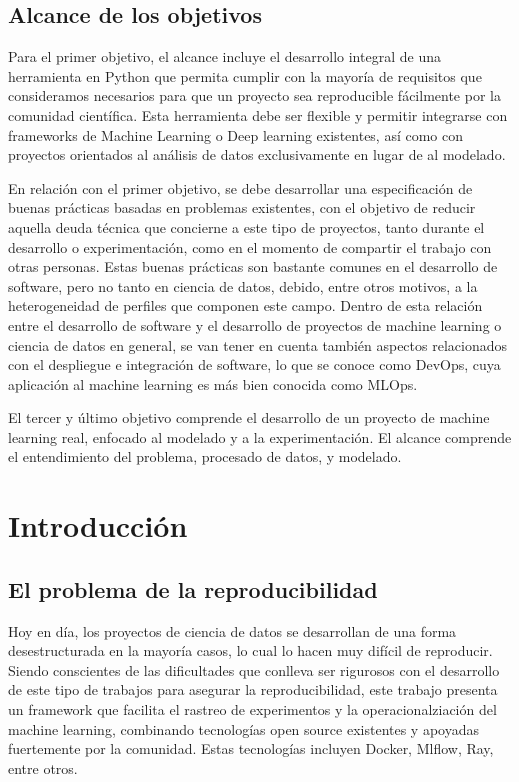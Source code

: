 \documentclass[
  12pt,
  a4paperpaper,
]{report}
\begin{document}
\hypertarget{alcance-de-los-objetivos}{%
\section{Alcance de los objetivos}\label{alcance-de-los-objetivos}}

Para el primer objetivo, el alcance incluye el desarrollo integral de
una herramienta en Python que permita cumplir con la mayoría de
requisitos que consideramos necesarios para que un proyecto sea
reproducible fácilmente por la comunidad científica. Esta herramienta
debe ser flexible y permitir integrarse con frameworks de Machine
Learning o Deep learning existentes, así como con proyectos orientados
al análisis de datos exclusivamente en lugar de al modelado.

En relación con el primer objetivo, se debe desarrollar una
especificación de buenas prácticas basadas en problemas existentes, con
el objetivo de reducir aquella deuda técnica que concierne a este tipo
de proyectos, tanto durante el desarrollo o experimentación, como en el
momento de compartir el trabajo con otras personas. Estas buenas
prácticas son bastante comunes en el desarrollo de software, pero no
tanto en ciencia de datos, debido, entre otros motivos, a la
heterogeneidad de perfiles que componen este campo. Dentro de esta
relación entre el desarrollo de software y el desarrollo de proyectos de
machine learning o ciencia de datos en general, se van tener en cuenta
también aspectos relacionados con el despliegue e integración de
software, lo que se conoce como DevOps, cuya aplicación al machine
learning es más bien conocida como MLOps.

El tercer y último objetivo comprende el desarrollo de un proyecto de
machine learning real, enfocado al modelado y a la experimentación. El
alcance comprende el entendimiento del problema, procesado de datos, y
modelado.

\hypertarget{introducciuxf3n}{%
\chapter{Introducción}\label{introducciuxf3n}}

\hypertarget{el-problema-de-la-reproducibilidad}{%
\section{El problema de la
reproducibilidad}\label{el-problema-de-la-reproducibilidad}}

Hoy en día, los proyectos de ciencia de datos se desarrollan de una
forma desestructurada en la mayoría casos, lo cual lo hacen muy difícil
de reproducir. Siendo conscientes de las dificultades que conlleva ser
rigurosos con el desarrollo de este tipo de trabajos para asegurar la
reproducibilidad, este trabajo presenta un framework que facilita el
rastreo de experimentos y la operacionalziación del machine learning,
combinando tecnologías open source existentes y apoyadas fuertemente por
la comunidad. Estas tecnologías incluyen Docker, Mlflow, Ray, entre
otros.
\end{document}
